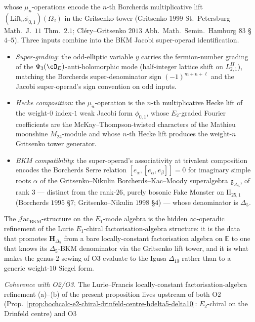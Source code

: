 \begin{proposition}
\begin{enumerate}[label=(\alph*),leftmargin=1.5em]
 whose $\mu_n$-operations encode the $n$-th Borcherds multiplicative
 lift $(\mathrm{Lift}_n\phi_{0,1})(\Omega_2)$ in the Gritsenko tower
 (Gritsenko $1999$ St.\ Petersburg Math.\ J.\ $11$ Thm.\ $2.1$;
 Cl\'ery--Gritsenko $2013$ Abh.\ Math.\ Semin.\ Hamburg $83$
 \S$4$--$5$). Three inputs combine into the BKM Jacobi super-operad
 identification.
 \begin{itemize}[leftmargin=1.2em,itemsep=0.2em]
 \item \emph{Super-grading}: the odd-elliptic variable $y$ carries
 the fermion-number grading of the $\Phi_3(\cO_E)$-anti-holomorphic
 mode (half-integer lattice shift on $L_{2,1}^{II}$), matching the
 Borcherds super-denominator sign $(-1)^{m+n+\ell}$ and the Jacobi
 super-operad's sign convention on odd inputs.
 \item \emph{Hecke composition}: the $\mu_n$-operation is the
 $n$-th multiplicative Hecke lift of the weight-$0$ index-$1$
 weak Jacobi form $\phi_{0,1}$, whose $E_2$-graded Fourier
 coefficients are the McKay--Thompson-twisted characters of the
 Mathieu moonshine $M_{24}$-module and whose $n$-th Hecke lift
 produces the weight-$n$ Gritsenko tower generator.
 \item \emph{BKM compatibility}: the super-operad's associativity
 at trivalent composition encodes the Borcherds Serre relation
 $[e_\alpha,[e_\alpha,e_\beta]]=0$ for imaginary simple roots $\alpha$
 of the Gritsenko--Nikulin Borcherds--Kac--Moody superalgebra
 $\mathfrak g_{\Delta_5}$, of rank $3$ --- distinct from the
 rank-$26$, purely bosonic Fake Monster on $\mathrm{II}_{25,1}$
 (Borcherds $1995$ \S$7$; Gritsenko--Nikulin $1998$ \S$4$) --- whose
 denominator is $\Delta_5$.
 \end{itemize}
 The $\mathcal J\mathrm{ac}_{\mathrm{BKM}}$-structure on the $E_1$-mode
 algebra is the hidden $\infty$-operadic refinement of the Lurie
 $E_1$-chiral factorisation-algebra structure: it is the data that
 promotes $\mathbf H_{\Delta_5}$ from a bare locally-constant
 factorisation algebra on $\mathbb E$ to one that knows its
 $\Delta_5$-BKM denominator via the Gritsenko lift tower, and it is
 what makes the genus-$2$ sewing of O3 evaluate to the Igusa
 $\Delta_{10}$ rather than to a generic weight-$10$ Siegel form.
\end{enumerate}
\emph{Coherence with O2/O3.} The Lurie--Francis locally-constant
factorisation-algebra refinement (a)--(b) of the present proposition
lives upstream of both O2
(Prop.~\ref{prop:hochcalc-e2-chiral-drinfeld-centre-hdelta5-delta10}:
$E_2$-chiral on the Drinfeld centre) and O3

\end{proposition}
